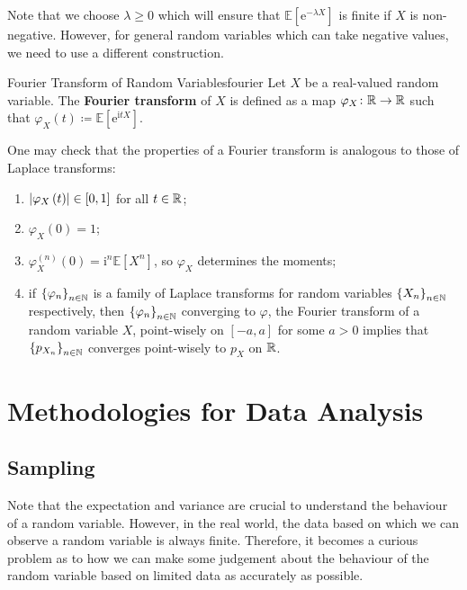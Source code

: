 \documentclass[math]{amznotes}
\theoremstyle{remark}
\newcommand{\0}{\mathbf{0}}
\newcommand{\1}{\mathbf{1}}
\newcommand{\e}{\mathrm{e}}
\newcommand{\im}{\mathrm{i}}
\begin{document}
Note that we choose $\lambda \geq 0$ which will ensure that $\mathbb{E}\left[\e^{-\lambda X}\right]$ is finite if $X$ is non-negative. However, for general random variables which can take negative values, we need to use a different construction.
\begin{dfnbox}{Fourier Transform of Random Variables}{fourier}
    Let $X$ be a real-valued random variable. The {\color{red} \textbf{Fourier transform}} of $X$ is defined as a map $\varphi_X \colon \mathbb{R} \to \mathbb{R}$ such that $\varphi_X\left(t\right) \coloneqq \mathbb{E}\left[\e^{\im tX}\right]$.
\end{dfnbox}
One may check that the properties of a Fourier transform is analogous to those of Laplace transforms:
\begin{enumerate}
    \item ${\left\lvert {\varphi_X\left(t\right)} \right\rvert} \in \left[0, 1\right]$ for all $t \in \mathbb{R}$;
    \item $\varphi_X\left(0\right) = 1$;
    \item $\varphi^{(n)}_X\left(0\right) = \im^n\mathbb{E}\left[X^n\right]$, so $\varphi_X$ determines the moments;
    \item if $\left\{\varphi_n\right\}_{n \in \mathbb{N}}$ is a family of Laplace transforms for random variables $\left\{X_n\right\}_{n \in \mathbb{N}}$ respectively, then $\left\{\varphi_n\right\}_{n \in \mathbb{N}}$ converging to $\varphi$, the Fourier transform of a random variable $X$, point-wisely on $\left[-a, a\right]$ for some $a > 0$ implies that $\left\{p_{X_n}\right\}_{n \in \mathbb{N}}$ converges point-wisely to $p_X$ on $\mathbb{R}$.
\end{enumerate}

\chapter{Methodologies for Data Analysis}
\section{Sampling}
Note that the expectation and variance are crucial to understand the behaviour of a random variable. However, in the real world, the data based on which we can observe a random variable is always finite. Therefore, it becomes a curious problem as to how we can make some judgement about the behaviour of the random variable based on limited data as accurately as possible.
\end{document}
